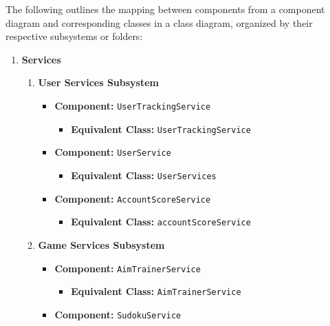 \documentclass[11pt,a4paper]{article}
\begin{document}
The following outlines the mapping between components from a component diagram and corresponding classes in a class diagram, organized by their respective subsystems or folders:
\begin{enumerate}[label=\textbf{\arabic*.}, ref=\arabic*]
    \item \textbf{Services}
        \begin{enumerate}[label=\textbf{\alph*.}, ref=\theenumi.\alph*]
            \item \textbf{User Services Subsystem}
                \begin{itemize}
                    \item \textbf{Component:} \texttt{UserTrackingService}
                        \begin{itemize}
                            \item \textbf{Equivalent Class:} \texttt{UserTrackingService}
                        \end{itemize}
                    \item \textbf{Component:} \texttt{UserService}
                        \begin{itemize}
                            \item \textbf{Equivalent Class:} \texttt{UserServices}
                        \end{itemize}
                    \item \textbf{Component:} \texttt{AccountScoreService}
                        \begin{itemize}
                            \item \textbf{Equivalent Class:} \texttt{accountScoreService}
                        \end{itemize}
                \end{itemize}
            \item \textbf{Game Services Subsystem}
                \begin{itemize}
                    \item \textbf{Component:} \texttt{AimTrainerService}
                        \begin{itemize}
                            \item \textbf{Equivalent Class:} \texttt{AimTrainerService}
                        \end{itemize}
                    \item \textbf{Component:} \texttt{SudokuService}
                        \begin{itemize}

\end{itemize}
\end{itemize}
\end{enumerate}
\end{enumerate}
\end{document}
